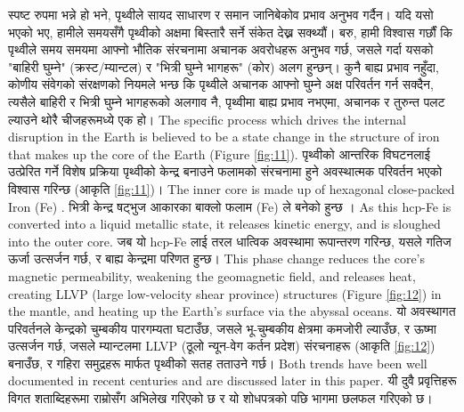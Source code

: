 \documentclass[10pt,twocolumn,letterpaper]{article}
\begin{document}
स्पष्ट रुपमा भन्ने हो भने, पृथ्वीले सायद साधारण र समान जानिबेकोव प्रभाव अनुभव गर्दैन। यदि यसो भएको भए, हामीले समयसँगै पृथ्वीको अक्षमा बिस्तारै सर्ने संकेत देख्न सक्थ्यौं। बरु, हामी विश्वास गर्छौं कि पृथ्वीले समय समयमा आफ्नो भौतिक संरचनामा अचानक अवरोधहरू अनुभव गर्छ, जसले गर्दा यसको "बाहिरी घुम्ने" (क्रस्ट/म्यान्टल) र "भित्री घुम्ने भागहरू" (कोर) अलग हुन्छन्। कुनै बाह्य प्रभाव नहुँदा, कोणीय संवेगको संरक्षणको नियमले भन्छ कि पृथ्वीले अचानक आफ्नो घुम्ने अक्ष परिवर्तन गर्न सक्दैन, त्यसैले बाहिरी र भित्री घुम्ने भागहरूको अलगाव नै, पृथ्वीमा बाह्य प्रभाव नभएमा, अचानक र तुरुन्त पलट ल्याउने थोरै चीजहरूमध्ये एक हो।
The specific process which drives the internal disruption in the Earth is believed to be a state change in the structure of iron that makes up the core of the Earth (Figure \ref{fig:11}). पृथ्वीको आन्तरिक विघटनलाई उत्प्रेरित गर्ने विशेष प्रक्रिया पृथ्वीको केन्द्र बनाउने फलामको संरचनामा हुने अवस्थात्मक परिवर्तन भएको विश्वास गरिन्छ (आकृति \ref{fig:11})। The inner core is made up of hexagonal close-packed Iron (Fe) \cite{141}. भित्री केन्द्र षट्भुज आकारका बाक्लो फलाम (Fe) ले बनेको हुन्छ \cite{141}। As this hcp-Fe is converted into a liquid metallic state, it releases kinetic energy, and is sloughed into the outer core. जब यो hcp-Fe लाई तरल धात्विक अवस्थामा रूपान्तरण गरिन्छ, यसले गतिज ऊर्जा उत्सर्जन गर्छ, र बाह्य केन्द्रमा परिणत हुन्छ। This phase change reduces the core's magnetic permeability, weakening the geomagnetic field, and releases heat, creating LLVP (large low-velocity shear province) structures (Figure \ref{fig:12}) \cite{38} in the mantle, and heating up the Earth's surface via the abyssal oceans. यो अवस्थागत परिवर्तनले केन्द्रको चुम्बकीय पारगम्यता घटाउँछ, जसले भू-चुम्बकीय क्षेत्रमा कमजोरी ल्याउँछ, र ऊष्मा उत्सर्जन गर्छ, जसले म्यान्टलमा LLVP (ठूलो न्यून-वेग कर्तन प्रदेश) संरचनाहरू (आकृति \ref{fig:12}) \cite{38} बनाउँछ, र गहिरा समुद्रहरू मार्फत पृथ्वीको सतह तताउने गर्छ। Both trends have been well documented in recent centuries and are discussed later in this paper. यी दुवै प्रवृत्तिहरू विगत शताब्दिहरूमा राम्रोसँग अभिलेख गरिएको छ र यो शोधपत्रको पछि भागमा छलफल गरिएको छ।
\end{document}
